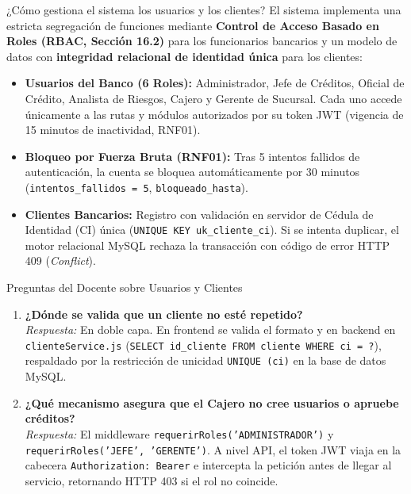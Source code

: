 \documentclass[11pt,letterpaper]{article}
\begin{document}
\begin{respuestabox}{¿Cómo gestiona el sistema los usuarios y los clientes?}
El sistema implementa una estricta segregación de funciones mediante \textbf{Control de Acceso Basado en Roles (RBAC, Sección 16.2)} para los funcionarios bancarios y un modelo de datos con \textbf{integridad relacional de identidad única} para los clientes:
\begin{itemize}
    \item \textbf{Usuarios del Banco (6 Roles):} Administrador, Jefe de Créditos, Oficial de Crédito, Analista de Riesgos, Cajero y Gerente de Sucursal. Cada uno accede únicamente a las rutas y módulos autorizados por su token JWT (vigencia de 15 minutos de inactividad, RNF01).
    \item \textbf{Bloqueo por Fuerza Bruta (RNF01):} Tras 5 intentos fallidos de autenticación, la cuenta se bloquea automáticamente por 30 minutos (\texttt{intentos\_fallidos = 5}, \texttt{bloqueado\_hasta}).
    \item \textbf{Clientes Bancarios:} Registro con validación en servidor de Cédula de Identidad (CI) única (\texttt{UNIQUE KEY uk\_cliente\_ci}). Si se intenta duplicar, el motor relacional MySQL rechaza la transacción con código de error HTTP 409 (\textit{Conflict}).
\end{itemize}
\end{respuestabox}

\begin{preguntatrampabox}{Preguntas del Docente sobre Usuarios y Clientes}
\begin{enumerate}
    \item \textbf{¿Dónde se valida que un cliente no esté repetido?}\\
    \textit{Respuesta:} En doble capa. En frontend se valida el formato y en backend en \texttt{clienteService.js} (\texttt{SELECT id\_cliente FROM cliente WHERE ci = ?}), respaldado por la restricción de unicidad \texttt{UNIQUE (ci)} en la base de datos MySQL.
    \item \textbf{¿Qué mecanismo asegura que el Cajero no cree usuarios o apruebe créditos?}\\
    \textit{Respuesta:} El middleware \texttt{requerirRoles('ADMINISTRADOR')} y \texttt{requerirRoles('JEFE', 'GERENTE')}. A nivel API, el token JWT viaja en la cabecera \texttt{Authorization: Bearer} e intercepta la petición antes de llegar al servicio, retornando HTTP 403 si el rol no coincide.
\end{enumerate}
\end{preguntatrampabox}
\end{document}
